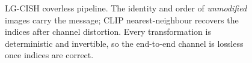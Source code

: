 \begin{figure}[t]
\caption{LG-CISH coverless pipeline. The identity and order of \emph{unmodified}
images carry the message; CLIP nearest-neighbour recovers the indices after
channel distortion. Every transformation is deterministic and invertible, so the
end-to-end channel is lossless once indices are correct.}
\label{fig:arch}
\end{figure}
